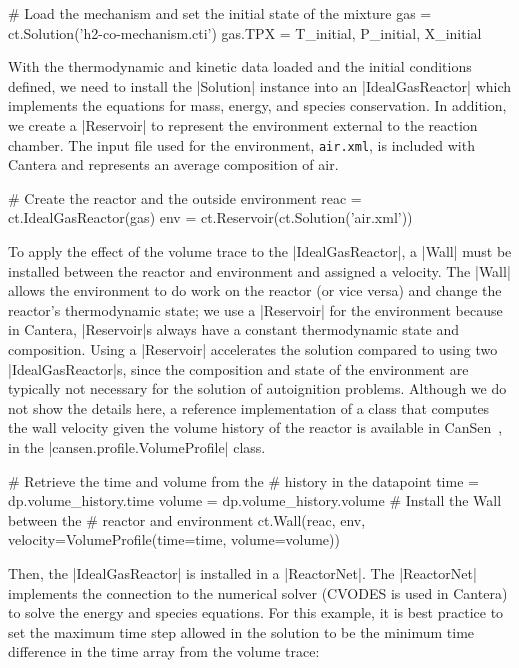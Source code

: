 \documentclass[12pt]{ijck}
\begin{document}
\begin{pythonbox}
# Load the mechanism and set the initial state of the mixture
gas = ct.Solution('h2-co-mechanism.cti')
gas.TPX = T_initial, P_initial, X_initial
\end{pythonbox}

With the thermodynamic and kinetic data loaded and the initial conditions defined, we  need to
install the \pybox|Solution| instance into an \pybox|IdealGasReactor| which implements the equations
for mass, energy, and species conservation. In addition, we create a \pybox|Reservoir| to represent
the environment external to the reaction chamber. The input file used for the environment,
\verb|air.xml|, is included with Cantera and represents an average composition of air.

\begin{pythonbox}
# Create the reactor and the outside environment
reac = ct.IdealGasReactor(gas)
env = ct.Reservoir(ct.Solution('air.xml'))
\end{pythonbox}
%
To apply the effect of the volume trace to the \pybox|IdealGasReactor|, a \pybox|Wall| must be
installed between the reactor and environment and assigned a velocity. The \pybox|Wall| allows the
environment to do work on the reactor (or vice versa) and change the reactor's thermodynamic state;
we use a \pybox|Reservoir| for the environment because in Cantera, \pybox|Reservoir|s always have a
constant thermodynamic state and composition. Using a \pybox|Reservoir| accelerates the solution
compared to using two \pybox|IdealGasReactor|s, since the composition and state of the environment
are typically not necessary for the solution of autoignition problems. Although we do not show the
details here, a reference implementation of a class that computes the wall velocity given the volume
history of the reactor is available in CanSen~\autocite{cansen}, in the
\pybox|cansen.profile.VolumeProfile| class.
%
\begin{pythonbox}
# Retrieve the time and volume from the
# history in the datapoint
time = dp.volume_history.time
volume = dp.volume_history.volume
# Install the Wall between the
# reactor and environment
ct.Wall(reac, env, velocity=VolumeProfile(time=time, volume=volume))
\end{pythonbox}

Then, the \pybox|IdealGasReactor| is installed in a \pybox|ReactorNet|. The \pybox|ReactorNet|
implements the connection to the numerical solver (CVODES \autocite{hindmarsh_sundials:_2005} is
used in Cantera) to solve the energy and species equations. For this example, it is best practice
to set the maximum time step allowed in the solution to be the minimum time difference in the time array from the volume trace:
\end{document}
